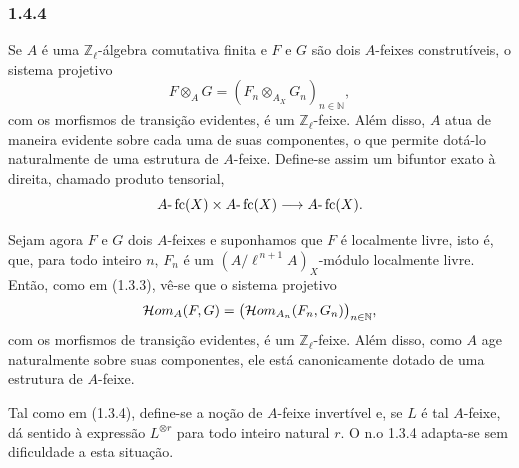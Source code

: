 \subsubsection*{1.4.4}
Se \(A\) é uma \(\mathbb Z_\ell\)-álgebra comutativa finita e \(F\) e \(G\) são dois \(A\)-feixes construtíveis, o sistema projetivo
\[
F\otimes_A G=(F_n\otimes_{A_X} G_n)_{n\in\mathbb N},
\]
com os morfismos de transição evidentes, é um \(\mathbb Z_\ell\)-feixe. Além disso, \(A\) atua de maneira evidente sobre cada uma de suas componentes, o que permite dotá-lo naturalmente de uma estrutura de \(A\)-feixe. Define-se assim um bifuntor exato à direita, chamado produto tensorial,
\[
A\text{-}\operatorname{fc}(X)\times A\text{-}\operatorname{fc}(X)\longrightarrow A\text{-}\operatorname{fc}(X).
\]

Sejam agora \(F\) e \(G\) dois \(A\)-feixes e suponhamos que \(F\) é localmente livre, isto é, que, para todo inteiro \(n\), \(F_n\) é um \((A/\ell^{\,n+1}A)_X\)-módulo localmente livre. Então, como em (1.3.3), vê-se que o sistema projetivo
\[
\mathcal{H}om_A(F,G)=\bigl(\mathcal{H}om_{A_n}(F_n,G_n)\bigr)_{n\in\mathbb N},
\]
com os morfismos de transição evidentes, é um \(\mathbb Z_\ell\)-feixe. Além disso, como \(A\) age naturalmente sobre suas componentes, ele está canonicamente dotado de uma estrutura de \(A\)-feixe.

Tal como em (1.3.4), define-se a noção de \(A\)-feixe invertível e, se \(L\) é tal \(A\)-feixe, dá sentido à expressão \(L^{\otimes r}\) para todo inteiro natural \(r\). O n.o 1.3.4 adapta-se sem dificuldade a esta situação.
